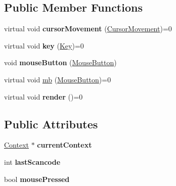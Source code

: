 \subsection*{Public Member Functions}
\begin{DoxyCompactItemize}
\item 
\hypertarget{classContext_aa940262b2ab80eea625f768f0b6fac7a}{}virtual void {\bfseries cursor\+Movement} (\hyperlink{classCursorMovement}{Cursor\+Movement})=0\label{classContext_aa940262b2ab80eea625f768f0b6fac7a}

\item 
\hypertarget{classContext_a70da8923b6a5a138d8603c609bc31fa6}{}virtual void {\bfseries key} (\hyperlink{classKey}{Key})=0\label{classContext_a70da8923b6a5a138d8603c609bc31fa6}

\item 
\hypertarget{classContext_a3999d157f67e3ba18cd704a5d4f0178a}{}void {\bfseries mouse\+Button} (\hyperlink{classMouseButton}{Mouse\+Button})\label{classContext_a3999d157f67e3ba18cd704a5d4f0178a}

\item 
virtual void \hyperlink{classContext_ab47a1f761c1408d246ef99159b197d3a}{mb} (\hyperlink{classMouseButton}{Mouse\+Button})=0
\item 
\hypertarget{classContext_a8fb1191127d9d8b5d7c356fc62189d9a}{}virtual void {\bfseries render} ()=0\label{classContext_a8fb1191127d9d8b5d7c356fc62189d9a}

\end{DoxyCompactItemize}
\subsection*{Public Attributes}
\begin{DoxyCompactItemize}
\item 
\hypertarget{classContext_a16b34e7c1aae337963724ec597e4750d}{}\hyperlink{classContext}{Context} $\ast$ {\bfseries current\+Context}\label{classContext_a16b34e7c1aae337963724ec597e4750d}

\item 
\hypertarget{classContext_af2a331132fbccf0a841f1f9ba47d4203}{}int {\bfseries last\+Scancode}\label{classContext_af2a331132fbccf0a841f1f9ba47d4203}

\item 
\hypertarget{classContext_ac3e36ee8fc5f660558345e72149a56ab}{}bool {\bfseries mouse\+Pressed}\label{classContext_ac3e36ee8fc5f660558345e72149a56ab}

\end{DoxyCompactItemize}


